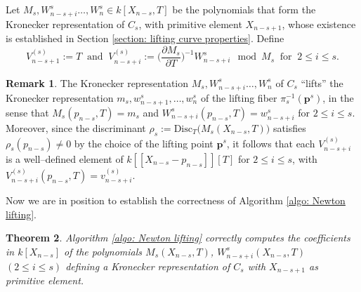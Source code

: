 \documentclass[pdflatex,sn-basic]{sn-jnl}%
\theoremstyle{thmstyleone}%
\newtheorem{theorem}{Theorem}%
\theoremstyle{thmstyletwo}%
\theoremstyle{thmstylethree}%
\theoremstyle{definition}
\newtheorem{remark}[theorem]{Remark}
\numberwithin{equation}{section}
\newcommand{\bfs}{\boldsymbol}
\begin{document}
Let $M_s,W_{n-s+i}^s\ldots,W_n^s\in k[X_{n-s}, T]$ be the
polynomials that form the Kronecker representation of $C_s$, with
primitive element $X_{n-s+1}$, whose existence is established in Section
\ref{section: lifting curve properties}. Define
%
$$V^{(s)}_{n-s+1}:=T\ \textrm{ and }\ V^{(s)}_{n-s+i}:=\Big(\frac{\partial M_s}{\partial
T}\Big)^{-1}W^s_{n-s+i} \mod M_s\ \textrm{ for }\ 2 \le i \le s.$$
%
\begin{remark}\label{rem: V_i_well_def}
The Kronecker representation $M_s,W_{n-s+i}^s\ldots,W_n^s$ of $C_s$
``lifts'' the Kronecker representation
$m_s,w_{n-s+1}^s,\ldots,w_n^s$ of the lifting fiber $\pi_s^{-1}(\bfs
p^s)$, in the sense that $M_s(p_{n-s},T)=m_s$ and
$W^s_{n-s+i}(p_{n-s},T)=w^s_{n-s+i}$ for $2\le i \le s$. Moreover,
since the discriminant
$\rho_s:=\mathrm{Disc}_{T}\big(M_s(X_{n-s},T)\big)$ satisfies
$\rho_s(p_{n-s})\neq 0$ by the choice of the lifting point $\bfs p^s$,
it follows that each $V^{(s)}_{n-s+i}$ is a well--defined element of
$k[\![X_{n-s}-p_{n-s}]\!][T]$ for $2 \le i \le s$, with 
$V^{(s)}_{n-s+i}(p_{n-s},T)=v^{(s)}_{n-s+i}$.
\end{remark}
%
Now we are in position to establish the correctness of
Algorithm \ref{algo: Newton lifting}.
%
\begin{theorem}\label{theo: correctedness: Newton lifting}
Algorithm \ref{algo: Newton lifting} correctly computes the
coefficients in $k[X_{n-s}]$ of the polynomials $M_s(X_{n-s}, T)$,
$W_{n-s+i}^{s}(X_{n-s}, T)$ $(2 \le i \le s)$ defining a
Kronecker representation of $C_s$ with $X_{n-s+1}$ as primitive element.
\end{theorem}
%
\end{document}
